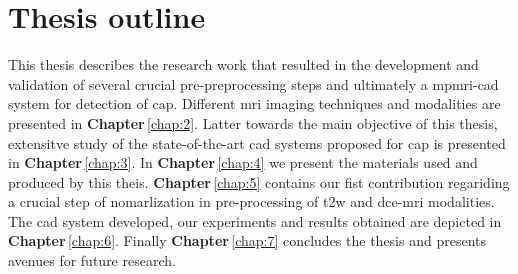 \section{Thesis outline} \label{sec:intro:outline}
This thesis describes the research work that resulted in the development and validation of several crucial pre-preprocessing steps and ultimately a \ac{mpmri}-\ac{cad} system for detection of \ac{cap}.
Different \ac{mri} imaging techniques and modalities are presented in \textbf{Chapter}\,\ref{chap:2}.
Latter towards the main objective of this thesis, extensitve study of the state-of-the-art \ac{cad} systems proposed for \ac{cap} is presented in \textbf{Chapter}\,\ref{chap:3}.
In \textbf{Chapter}\,\ref{chap:4} we present the materials used and produced by this theis. 
\textbf{Chapter}\,\ref{chap:5} contains our fist contribution regariding a crucial step of nomarlization in pre-processing of \ac{t2w} and \ac{dce}-\ac{mri} modalities.
The \ac{cad} system developed, our experiments and results obtained are depicted in \textbf{Chapter}\,\ref{chap:6}.
Finally \textbf{Chapter}\,\ref{chap:7} concludes the thesis and presents avenues for future research.
